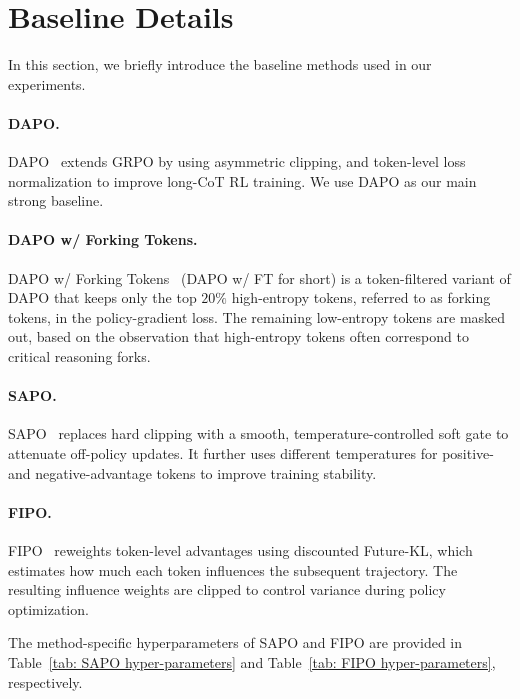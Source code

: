 \documentclass{llmxive}
\begin{document}
\section{Baseline Details}
\label{app:baseline-details}

In this section, we briefly introduce the baseline methods used in our experiments.

\paragraph{DAPO.}
DAPO~\citep{yu2025dapo} extends GRPO by using asymmetric clipping, and token-level loss normalization to improve long-CoT RL training. We use DAPO as our main strong baseline.

\paragraph{DAPO w/ Forking Tokens.}
DAPO w/ Forking Tokens~\citep{wang2025beyond} (DAPO w/ FT for short) is a token-filtered variant of DAPO that keeps only the top \(20\%\) high-entropy tokens, referred to as forking tokens, in the policy-gradient loss. 
The remaining low-entropy tokens are masked out, based on the observation that high-entropy tokens often correspond to critical reasoning forks.

\paragraph{SAPO.}
SAPO~\citep{gao2025soft} replaces hard clipping with a smooth, temperature-controlled soft gate to attenuate off-policy updates. 
It further uses different temperatures for positive- and negative-advantage tokens to improve training stability.

\paragraph{FIPO.}
FIPO~\citep{ma2026fipo} reweights token-level advantages using discounted Future-KL, which estimates how much each token influences the subsequent trajectory. 
The resulting influence weights are clipped to control variance during policy optimization.

The method-specific hyperparameters of SAPO and FIPO are provided in Table~\ref{tab: SAPO hyper-parameters} and Table~\ref{tab: FIPO hyper-parameters}, respectively.
\end{document}
